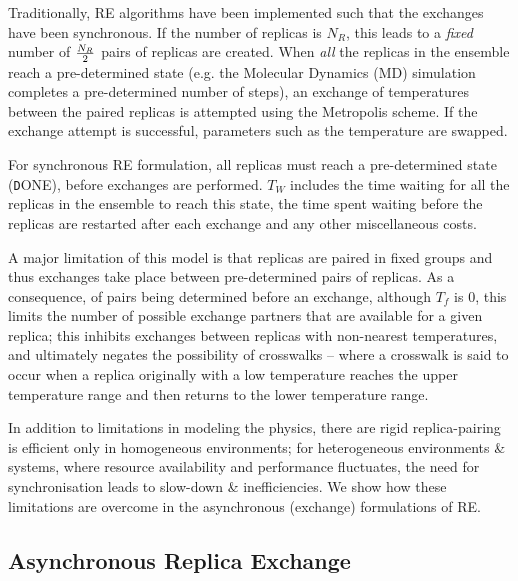 \documentclass{rspublic}
\begin{document}
Traditionally, RE algorithms have been implemented such that the
exchanges have been synchronous.  If the number of replicas is
${N_R}$, this leads to a {\it fixed} number of ${N_R \over 2}$ pairs
of replicas are created.  When \emph{all} the replicas in the ensemble
reach a pre-determined state (e.g. the Molecular Dynamics (MD)
simulation completes a pre-determined number of steps), an exchange of
temperatures between the paired replicas is attempted using the
Metropolis scheme.  If the exchange attempt is successful, parameters
such as the temperature are swapped.


For synchronous RE formulation, all replicas must reach a
pre-determined state ({\texttt DONE}), before exchanges are performed.
$T_W$ includes the time waiting for all the replicas in the ensemble
to reach this state, the time spent waiting before the replicas are
restarted after each exchange and any other miscellaneous costs.

A major limitation of this model is that replicas are paired in fixed
groups and thus exchanges take place between pre-determined pairs of
replicas.  As a consequence, of pairs being determined before an
exchange, although $T_f$ is $0$, this limits the number of possible
exchange partners that are available for a given replica; this
inhibits exchanges between replicas with non-nearest temperatures, and
ultimately negates the possibility of crosswalks -- where a crosswalk
is said to occur when a replica originally with a low temperature
reaches the upper temperature range and then returns to the lower
temperature range.

In addition to limitations in modeling the physics, there are rigid
replica-pairing is efficient only in homogeneous environments; for
heterogeneous environments \& systems, where resource availability and
performance fluctuates, the need for synchronisation leads to
slow-down \& inefficiencies. We show how these limitations are
overcome in the asynchronous (exchange) formulations of RE.

\subsection{Asynchronous Replica Exchange}

\end{document}
